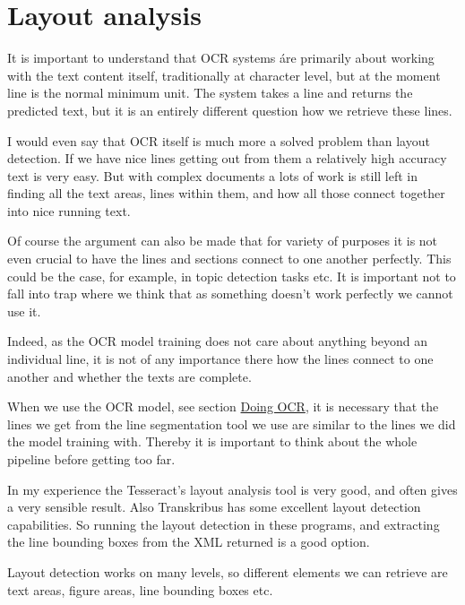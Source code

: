\documentclass[]{book}
\begin{document}
\hypertarget{layout}{%
\chapter{Layout analysis}\label{layout}}

It is important to understand that OCR systems áre primarily about working with the text content itself, traditionally at character level, but at the moment line is the normal minimum unit. The system takes a line and returns the predicted text, but it is an entirely different question how we retrieve these lines.

I would even say that OCR itself is much more a solved problem than layout detection. If we have nice lines getting out from them a relatively high accuracy text is very easy. But with complex documents a lots of work is still left in finding all the text areas, lines within them, and how all those connect together into nice running text.

Of course the argument can also be made that for variety of purposes it is not even crucial to have the lines and sections connect to one another perfectly. This could be the case, for example, in topic detection tasks etc. It is important not to fall into trap where we think that as something doesn't work perfectly we cannot use it.

Indeed, as the OCR model training does not care about anything beyond an individual line, it is not of any importance there how the lines connect to one another and whether the texts are complete.

When we use the OCR model, see section \href{./doing-ocr}{Doing OCR}, it is necessary that the lines we get from the line segmentation tool we use are similar to the lines we did the model training with. Thereby it is important to think about the whole pipeline before getting too far.

In my experience the Tesseract's layout analysis tool is very good, and often gives a very sensible result. Also Transkribus has some excellent layout detection capabilities. So running the layout detection in these programs, and extracting the line bounding boxes from the XML returned is a good option.

Layout detection works on many levels, so different elements we can retrieve are text areas, figure areas, line bounding boxes etc.
\end{document}
